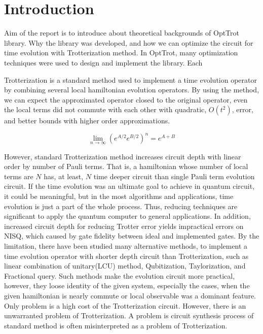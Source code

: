 \documentclass[a4paper,12pt]{article}
\begin{document}

\section{Introduction}

Aim of the report is to introduce about theoretical backgrounds of
OptTrot library. Why the library was developed, and how we can optimize 
the circuit for time evolution with Trotterization method.
In OptTrot, many optimization techniques were used to design and implement
the library. Each 

Trotterization is a standard method used to implement a time evolution operator 
by combining several local hamiltonian evolution operators.
By using the method, we can expect the approximated operator closed to the original
operator, even the local terms did not commute with each other with quadratic, $O(t^2)$, error,
and better bounds with higher order approximations\cite{suzuki_finding_2005}.

\begin{equation}
    \lim_{n \rightarrow \infty} (e^{A/2} e^{B/2})^n = e^{A+B}
\end{equation}

However, standard Trotterization method increases circuit depth with linear order 
by number of Pauli terms. That is, a hamiltonian whose number of local terms are $N$
has, at least, $N$ time deeper circuit than single Pauli term evolution circuit.
If the time evolution was an ultimate goal to achieve in quantum circuit, 
it could be meaningful, but in the most algorithms and applications, time evolution 
is just a part of the whole process. 
Thus, reducing techniques are significant to apply the quantum computer to general applications.
In addition, increased circuit depth for reducing Trotter error yields 
impractical errors on NISQ, which caused by gate fidelity between ideal and implemented gates.
By the limitation, there have been studied many alternative methods, to implement a time evolution operator 
with shorter depth circuit than Trotterization, 
such as linear combination of unitary(LCU) method\cite{dewolf2023quantumcomputinglecturenotes}, Qubitization\cite{Low_2019}, 
Taylorization\cite{PhysRevLett.114.090502}, and Fractional query\cite{Berry_2014}.
Such methods make the evolution circuit more practical, however, they loose 
identity of the given system, especially the cases, when the given hamiltonian is nearly commute
or local observable was a dominant feature\cite{childs_theory_2021}. 
Only problem is a high cost of the Trotterization circuit. 
However, there is an unwarranted problem of Trotterization. 
A problem is circuit synthesis process of standard method\cite{nielsen2010quantum}
is often misinterpreted as a problem of Trotterization.
\end{document}
